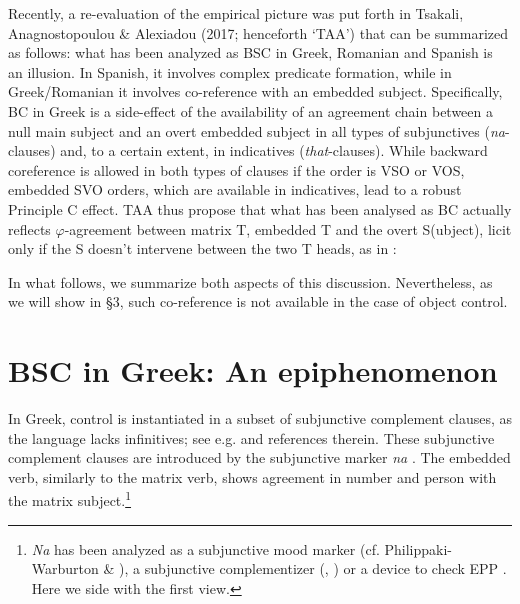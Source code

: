\documentclass[output=paper]{langsci/langscibook}
\begin{document}
Recently, a re-evaluation of the empirical picture was put forth in Tsakali, Anagnostopoulou \& Alexiadou (2017; henceforth ‘TAA’) that can be summarized as follows: what has been analyzed as BSC in Greek, Romanian and Spanish is an illusion. In Spanish, it involves complex predicate formation, while in Greek/Romanian it involves co-reference with an embedded subject. Specifically, BC in Greek is a side-effect of the availability of an agreement chain between a null main subject and an overt embedded subject in all types of subjunctives (\textit{na}{}-clauses) and, to a certain extent, in indicatives (\textit{that}{}-clauses). While backward coreference is allowed in both types of clauses if the order is VSO or VOS, embedded SVO orders, which are available in indicatives, lead to a robust Principle C effect. TAA thus propose that what has been analysed as BC actually reflects $\varphi ${}-agreement between matrix T, embedded T and the overt S(ubject), licit only if the S doesn’t intervene between the two T heads, as in :

\ea%
    \label{ex:alexiadou:2}
    \z
\z    

In what follows, we summarize both aspects of this discussion. Nevertheless, as we will show in §3, such co-reference is not available in the case of object control.

\section{BSC in Greek: An epiphenomenon}%

In Greek, control is instantiated in a subset of subjunctive complement clauses, as the language lacks infinitives; see e.g. \citet{Varlokosta1994} and references therein. These subjunctive complement clauses are introduced by the subjunctive marker \textit{na} . The embedded verb, similarly to the matrix verb, shows agreement in number and person with the matrix subject.\footnote{\textit{Na} has been analyzed as a subjunctive mood marker (cf. Philippaki-Warburton \& \citealt{Veloudis1984}), a subjunctive complementizer (\citealt{Tsoulas1993}, \citealt{Aggouraki1991}) or a device to check EPP \citep{Roussou2009}. Here we side with the first view.} 
\end{document}
